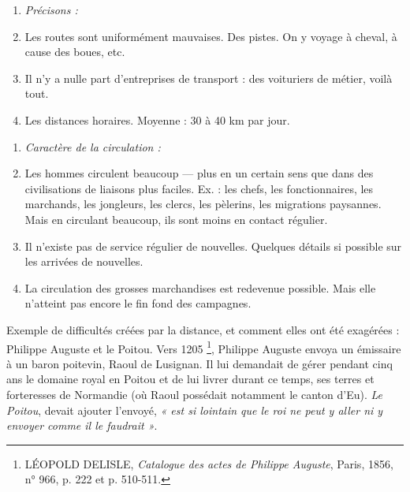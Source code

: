 \documentclass[french,twoside]{book} %
\newlength{\listmod}
\newcommand{\listhead}[1]{\hspace{-1\listmod}\emph{#1}}
\newcommand\chapteropen{} %
\newcommand\chapterclose{} %
\renewcommand\chapteropen{} %
\renewcommand\chapterclose{} %
\begin{document}
\begin{enumerate}[itemsep=0pt,]
\item[]\listhead{Précisons :}
\item Les routes sont uniformément mauvaises. Des pistes. On y voyage à cheval, à cause des boues, etc.
\item Il n’y a nulle part d’entreprises de transport : des voituriers de métier, voilà tout.
\item Les distances horaires. Moyenne : 30 à 40 km par jour.

\end{enumerate}
\begin{enumerate}[itemsep=0pt,]
\item[]\listhead{Caractère de la circulation :}
\item Les hommes circulent beaucoup — plus en un certain sens que dans des civilisations de liaisons plus faciles. Ex. : les chefs, les fonctionnaires, les marchands, les jongleurs, les clercs, les pèlerins, les migrations paysannes. Mais en circulant beaucoup, ils sont moins en contact régulier.
\item Il n’existe pas de service régulier de nouvelles. Quelques détails si possible sur les arrivées de nouvelles.
\item La circulation des grosses marchandises est redevenue possible. Mais elle n’atteint pas encore le fin fond des campagnes.

\end{enumerate}\noindent Exemple de difficultés créées par la distance, et comment elles ont été exagérées : Philippe Auguste et le Poitou. Vers 1205 \footnote{ LÉOPOLD DELISLE, {\itshape Catalogue des actes de Philippe Auguste}, Paris, 1856, n° 966, p. 222 et p. 510-511.}, Philippe Auguste envoya un émissaire à un baron poitevin, Raoul de Lusignan. Il lui demandait de gérer pendant cinq ans le domaine royal en Poitou et de lui livrer durant ce temps, ses terres et forteresses de Normandie (où Raoul possédait notamment le canton d’Eu). \emph{Le Poitou}, devait ajouter l’envoyé, \emph{« est si lointain que le roi ne peut y aller ni y envoyer comme il le faudrait »}.
\chapterclose


\chapteropen
\end{document}
